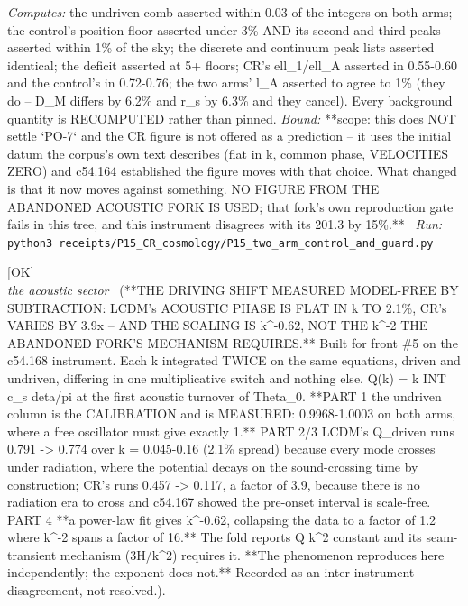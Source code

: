 \begin{description}
\emph{Computes:} the undriven comb asserted within 0.03 of the integers on both arms; the control's position floor asserted under 3\% AND its second and third peaks asserted within 1\% of the sky; the discrete and continuum peak lists asserted identical; the deficit asserted at 5+ floors; CR's ell\_1/ell\_A asserted in 0.55-0.60 and the control's in 0.72-0.76; the two arms' l\_A asserted to agree to 1\% (they do -- D\_M differs by 6.2\% and r\_s by 6.3\% and they cancel). Every background quantity is RECOMPUTED rather than pinned.
 \emph{Bound:} **scope: this does NOT settle `PO-7` and the CR figure is not offered as a prediction -- it uses the initial datum the corpus's own text describes (flat in k, common phase, VELOCITIES ZERO) and c54.164 established the figure moves with that choice. What changed is that it now moves against something. NO FIGURE FROM THE ABANDONED ACOUSTIC FORK IS USED; that fork's own reproduction gate fails in this tree, and this instrument disagrees with its 201.3 by 15\%.**
\ \emph{Run:} \texttt{python3 receipts/P15\_CR\_cosmology/P15\_two\_arm\_control\_and\_guard.py}
\item[\label{rcpt:P15_the_driving_shift_by_subtraction}\texttt{P15\_the\_driving\_shift\_by\_subtraction}]\hfill\textsf{[OK]}\\
\textit{the acoustic sector} \ (**THE DRIVING SHIFT MEASURED MODEL-FREE BY SUBTRACTION: LCDM's ACOUSTIC PHASE IS FLAT IN k TO 2.1\%, CR's VARIES BY 3.9x -- AND THE SCALING IS k\textasciicircum{}-0.62, NOT THE k\textasciicircum{}-2 THE ABANDONED FORK'S MECHANISM REQUIRES.** Built for front \#5 on the c54.168 instrument. Each k integrated TWICE on the same equations, driven and undriven, differing in one multiplicative switch and nothing else. Q(k) = k INT c\_s deta/pi at the first acoustic turnover of Theta\_0. **PART 1 the undriven column is the CALIBRATION and is MEASURED: 0.9968-1.0003 on both arms, where a free oscillator must give exactly 1.** PART 2/3 LCDM's Q\_driven runs 0.791 -> 0.774 over k = 0.045-0.16 (2.1\% spread) because every mode crosses under radiation, where the potential decays on the sound-crossing time by construction; CR's runs 0.457 -> 0.117, a factor of 3.9, because there is no radiation era to cross and c54.167 showed the pre-onset interval is scale-free. PART 4 **a power-law fit gives k\textasciicircum{}-0.62, collapsing the data to a factor of 1.2 where k\textasciicircum{}-2 spans a factor of 16.** The fold reports Q k\textasciicircum{}2 constant and its seam-transient mechanism (3H/k\textasciicircum{}2) requires it. **The phenomenon reproduces here independently; the exponent does not.** Recorded as an inter-instrument disagreement, not resolved.). 

\end{description}
